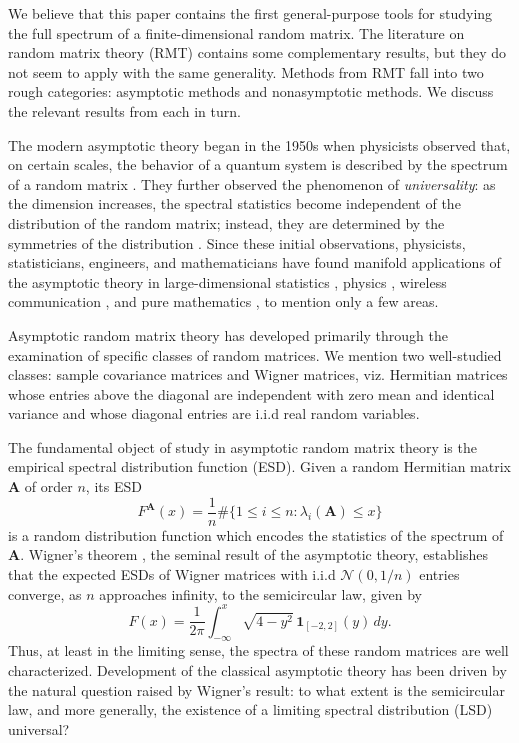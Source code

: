 \documentclass[11pt,letterpaper,twoside,reqno,nosumlimits]{amsart}
\newcommand{\mat}[1]{\ensuremath{\bm{#1}}} %
\theoremstyle{remark}
\numberwithin{equation}{section}
\numberwithin{thm}{section}
\numberwithin{prop}{section}
\numberwithin{defn}{section}
\numberwithin{remark}{section}
\begin{document}
We believe that this paper contains the first general-purpose tools for studying the full spectrum of a finite-dimensional random matrix. The literature on random matrix theory (RMT) contains some complementary results, but they do not seem to apply with the same generality. Methods from RMT fall into two rough categories: asymptotic methods and nonasymptotic methods. We discuss the relevant results from each in turn.

The modern asymptotic theory began in the 1950s when physicists observed that, on certain scales, the behavior of a quantum system is described by the spectrum of a random matrix \cite{Mehta04}. They further observed the phenomenon of \emph{universality}: as the dimension increases, the spectral statistics become independent of the distribution of the random matrix; instead, they are determined by the symmetries of the distribution \cite{Deift07}. Since these initial observations, physicists, statisticians, engineers, and mathematicians have found manifold applications of the asymptotic theory in large-dimensional statistics \cite{Johnstone01,Johnstone07,ElKaroui08}, physics \cite{Guhretal98,Mehta04}, wireless communication \cite{TulinoVerdu04,SilversteinTulino06}, and pure mathematics \cite{RudnickSarnack96,BerryKeating99}, to mention only a few areas. 

Asymptotic random matrix theory has developed primarily through the examination of specific classes of random matrices. We mention two well-studied classes: sample covariance matrices and Wigner matrices, viz. Hermitian matrices whose entries above the diagonal are independent with zero mean and identical variance and whose diagonal entries are i.i.d real random variables. 

The fundamental object of study in asymptotic random matrix theory is the empirical spectral distribution function (ESD). Given a random Hermitian matrix $\mat{A}$ of order $n$, its ESD
\[
F^{\mat{A}}(x) = \frac{1}{n} \#\{ 1 \leq i \leq n : \lambda_i(\mat{A}) \leq x \}
\]
is a random distribution function which encodes the statistics of the spectrum of $\mat{A}.$ Wigner's theorem \cite{Wig55}, the seminal result of the asymptotic theory, establishes that the expected ESDs of Wigner matrices with i.i.d $\mathcal{N}(0, 1/n)$ entries converge, as $n$ approaches infinity, to the semicircular law, given by 
\[
F(x) =  \frac{1}{2\pi}\int_{-\infty}^x \sqrt{4-y^2} \, \mathbf{1}_{[-2,2]}(y)\, dy.
\] 
Thus, at least in the limiting sense, the spectra of these random matrices are well characterized. Development of the classical asymptotic theory has been driven by the natural question raised by Wigner's result: to what extent is the semicircular law, and more generally, the existence of a limiting spectral distribution (LSD) universal?
\end{document}
